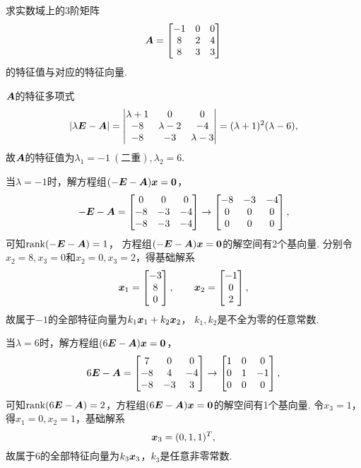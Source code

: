 \begin{example}
求实数域上的3阶矩阵\[
	\boldsymbol{A} = \begin{bmatrix}
		-1 & 0 & 0 \\
		8 & 2 & 4 \\
		8 & 3 & 3
	\end{bmatrix}
\]的特征值与对应的特征向量.
\begin{solution}
\(\boldsymbol{A}\)的特征多项式\[
	\abs{\lambda\boldsymbol{E}-\boldsymbol{A}}
	= \begin{vmatrix}
		\lambda+1 & 0 & 0 \\
		-8 & \lambda-2 & -4 \\
		-8 & -3 & \lambda-3
	\end{vmatrix}
	= (\lambda+1)^2 (\lambda-6),
\]
故\(\boldsymbol{A}\)的特征值为\(\lambda_1=-1\ (\text{二重}),
\lambda_2=6\).

当\(\lambda=-1\)时，解方程组\((-\boldsymbol{E}-\boldsymbol{A})\boldsymbol{x} = \boldsymbol0\)，\[
	-\boldsymbol{E}-\boldsymbol{A} = \begin{bmatrix}
		0 & 0 & 0 \\
		-8 & -3 & -4 \\
		-8 & -3 & -4
	\end{bmatrix} \to \begin{bmatrix}
		-8 & -3 & -4 \\
		0 & 0 & 0 \\
		0 & 0 & 0
	\end{bmatrix},
\]
可知\(\rank(-\boldsymbol{E}-\boldsymbol{A}) = 1\)，
方程组\((-\boldsymbol{E}-\boldsymbol{A})\boldsymbol{x} = \boldsymbol0\)的解空间有2个基向量.
分别令\(x_2 = 8, x_3 = 0\)和\(x_2 = 0, x_3 = 2\)，得基础解系\[
	\boldsymbol{x}_1 = \begin{bmatrix} -3 \\ 8 \\ 0 \end{bmatrix},
	\qquad
	\boldsymbol{x}_2 = \begin{bmatrix} -1 \\ 0 \\ 2 \end{bmatrix},
\]
故属于\(-1\)的全部特征向量为\(k_1 \boldsymbol{x}_1 + k_2 \boldsymbol{x}_2\)，
\(k_1,k_2\)是不全为零的任意常数.

当\(\lambda=6\)时，解方程组\((6\boldsymbol{E}-\boldsymbol{A})\boldsymbol{x} = \boldsymbol0\)，\[
	6\boldsymbol{E}-\boldsymbol{A} = \begin{bmatrix}
		7 & 0 & 0 \\
		-8 & 4 & -4 \\
		-8 & -3 & 3
	\end{bmatrix} \to \begin{bmatrix}
		1 & 0 & 0 \\
		0 & 1 & -1 \\
		0 & 0 & 0
	\end{bmatrix},
\]
可知\(\rank(6\boldsymbol{E}-\boldsymbol{A}) = 2\)，方程组\((6\boldsymbol{E}-\boldsymbol{A})\boldsymbol{x} = \boldsymbol0\)的解空间有1个基向量.
令\(x_3 = 1\)，得\(x_1 = 0, x_2 = 1\)，基础解系\[
	\boldsymbol{x}_3 = (0,1,1)^T,
\]
故属于\(6\)的全部特征向量为\(k_3 \boldsymbol{x}_3\)，\(k_3\)是任意非零常数.
\end{solution}
\end{example}

